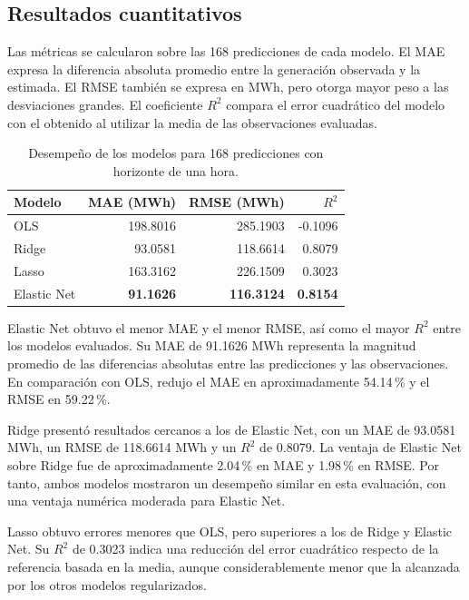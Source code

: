 \subsection{Resultados cuantitativos}

Las métricas se calcularon sobre las 168 predicciones de cada modelo. El MAE expresa la diferencia absoluta promedio entre la generación observada y la estimada. El RMSE también se expresa en MWh, pero otorga mayor peso a las desviaciones grandes. El coeficiente $R^2$ compara el error cuadrático del modelo con el obtenido al utilizar la media de las observaciones evaluadas.

\begin{table}[htbp]
    \centering
    \caption{Desempeño de los modelos para 168 predicciones con horizonte de una hora.}
    \label{tab:resultados-lineales-una-hora}
    \begin{tabular}{lrrr}
        \toprule
        Modelo & MAE (MWh) & RMSE (MWh) & $R^2$ \\
        \midrule
        OLS         & 198.8016 & 285.1903 & -0.1096 \\
        Ridge       &  93.0581 & 118.6614 &  0.8079 \\
        Lasso       & 163.3162 & 226.1509 &  0.3023 \\
        Elastic Net & \textbf{91.1626} & \textbf{116.3124} & \textbf{0.8154} \\
        \bottomrule
    \end{tabular}
\end{table}

Elastic Net obtuvo el menor MAE y el menor RMSE, así como el mayor $R^2$ entre los modelos evaluados. Su MAE de 91.1626 MWh representa la magnitud promedio de las diferencias absolutas entre las predicciones y las observaciones. En comparación con OLS, redujo el MAE en aproximadamente 54.14\,\% y el RMSE en 59.22\,\%.

Ridge presentó resultados cercanos a los de Elastic Net, con un MAE de 93.0581 MWh, un RMSE de 118.6614 MWh y un $R^2$ de 0.8079. La ventaja de Elastic Net sobre Ridge fue de aproximadamente 2.04\,\% en MAE y 1.98\,\% en RMSE. Por tanto, ambos modelos mostraron un desempeño similar en esta evaluación, con una ventaja numérica moderada para Elastic Net.

Lasso obtuvo errores menores que OLS, pero superiores a los de Ridge y Elastic Net. Su $R^2$ de 0.3023 indica una reducción del error cuadrático respecto de la referencia basada en la media, aunque considerablemente menor que la alcanzada por los otros modelos regularizados.

